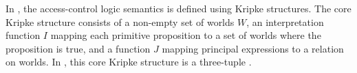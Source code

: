 

In \cite{ACST}, the access-control logic semantics is defined using
Kripke structures. The core Kripke structure consists of a non-empty
set of worlds $W$, an interpretation function $I$ mapping each
primitive proposition to a set of worlds where the proposition is
true, and a function $J$ mapping principal expressions to a relation
on worlds. In \cite{ACST}, this core Kripke structure is a three-tuple
.

